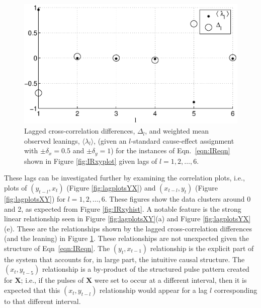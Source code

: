 \begin{figure}[ht]
\begin{center}
\includegraphics[scale=0.7]{NoisyResponseExample_LandLCC.eps} 
\end{center}
\caption{Lagged cross-correlation differences, $\Delta_l$, and weighted mean observed leanings, $\langle\lambda_l\rangle$, (given an $l$-standard cause-effect assignment with $\pm\delta_x = 0.5$ and $\pm\delta_y=1$) for the instances of Eqn.\ \ref{eqn:IReqn} shown in Figure \ref{fig:IRxyplot} given lags of $l=1,2,\ldots,6$.}
\label{fig:IRxyLandLCC}
\end{figure}

These lags can be investigated further by examining the correlation plots, i.e., plots of $(y_{t-l},x_t)$ (Figure \ref{fig:lagplotsYX}) and $(x_{t-l},y_t)$ (Figure \ref{fig:lagplotsXY}) for $l=1,2,\ldots,6$.  These figures show the data clusters around 0 and 2, as expected from Figure \ref{fig:IRxyhist}.  A notable feature is the strong linear relationship seen in Figure \ref{fig:lagplotsXY}(a) and Figure \ref{fig:lagplotsYX}(e).  These are the relationships shown by the lagged cross-correlation differences (and the leaning) in Figure \ref{fig:IRxyLandLCC}.  These relationships are not unexpected given the structure of Eqn\ \ref{eqn:IReqn}.  The $(y_t,x_{t-1})$ relationship is the explicit part of the system that accounts for, in large part, the intuitive causal structure.  The $(x_t,y_{t-5})$ relationship is a by-product of the structured pulse pattern created for $\mathbf{X}$; i.e., if the pulses of $\mathbf{X}$ were set to occur at a different interval, then it is expected that this $(x_t,y_{t-l})$ relationship would appear for a lag $l$ corresponding to that different interval.  

